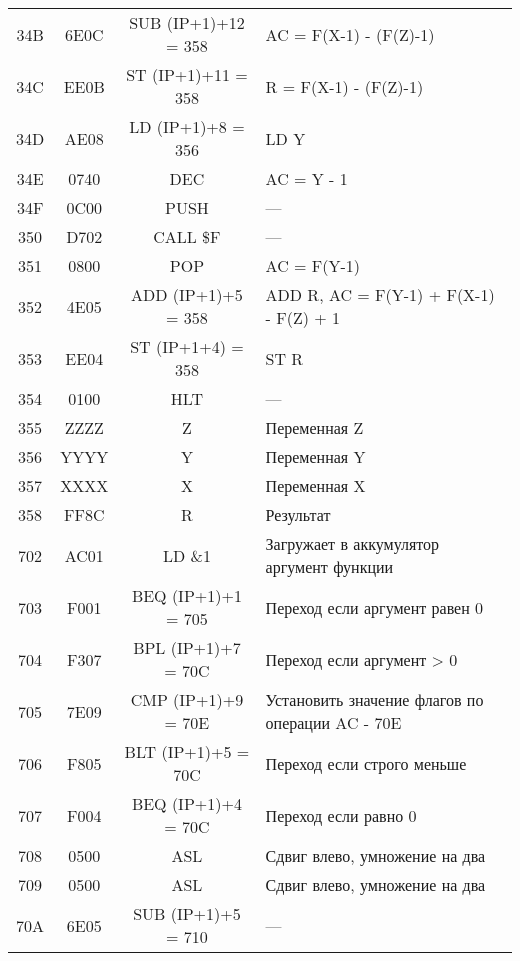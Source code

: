 \begin{table}[h!]
\begin{longtable}{| c | c | c | p{9.5cm} |}
        34B   & 6E0C        & SUB (IP+1)+12 = 358 & AC = F(X-1) - (F(Z)-1)                                                   \\
        34C & EE0B & ST (IP+1)+11 = 358 & R = F(X-1) - (F(Z)-1) \\
        34D & AE08 & LD (IP+1)+8 = 356 & LD Y \\
        34E & 0740 & DEC & AC = Y - 1 \\
        34F & 0C00 & PUSH & --- \\
        350 & D702 & CALL \$F & --- \\
        351 & 0800 & POP & AC = F(Y-1) \\
        352 & 4E05 & ADD (IP+1)+5 = 358 & ADD R, AC = F(Y-1) + F(X-1) - F(Z) + 1 \\
        353 & EE04 & ST (IP+1+4) = 358 & ST R \\
        354 & 0100 & HLT & --- \\
        355 & ZZZZ & Z & Переменная Z \\
        356 & YYYY & Y & Переменная Y \\
        357 & XXXX & X & Переменная X \\
        358 & FF8C & R & Результат \\
        \hline
        \hline
        702   & AC01        & LD \&1              & Загружает в аккумулятор аргумент функции              \\
        703   & F001        & BEQ (IP+1)+1 = 705  & Переход если аргумент равен 0                         \\
        704   & F307        & BPL (IP+1)+7 = 70C  & Переход если аргумент > 0                             \\
        705   & 7E09        & CMP (IP+1)+9 = 70E  & Установить значение флагов по операции AC - 70E       \\
        706   & F805        & BLT (IP+1)+5 = 70C  & Переход если строго меньше                            \\
        707   & F004        & BEQ (IP+1)+4 = 70C  & Переход если равно 0                                  \\
        708   & 0500        & ASL                 & Сдвиг влево, умножение на два                                                   \\
        709   & 0500        & ASL                 & Сдвиг влево, умножение на два                                                   \\
        70A   & 6E05        & SUB (IP+1)+5 = 710  & ---                                                   \\

\end{longtable}
\end{table}
